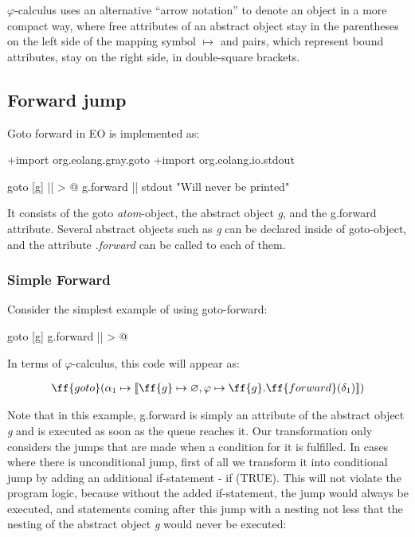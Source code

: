 \documentclass[sigplan,review,11pt,nonacm,natbib=false]{acmart}
\begin{document}
$\varphi$-calculus uses an alternative “arrow notation” to denote an object in a more compact way, where free attributes of an abstract object stay in the parentheses on the left side of the mapping symbol $\mapsto$ and pairs, which represent bound attributes, stay on the right side, in double-square brackets.


\subsection{Forward jump}
Goto forward in EO is implemented as:

\begin{ffcode}
+import org.eolang.gray.goto
+import org.eolang.io.stdout

goto
  [g]
    || > @
      g.forward ||
      stdout "Will never be printed"
\end{ffcode}

It consists of the goto \emph{atom}-object, the abstract object \emph{g}, and the g.forward attribute. Several abstract objects such as \emph{g} can be declared inside of goto-object, and the attribute \emph{.forward} can be called to each of them.

\subsubsection{Simple Forward}
Consider the simplest example of using goto-forward:

\begin{ffcode}
goto
  [g]
    g.forward || > @
\end{ffcode}

In terms of $\varphi$-calculus, this code will appear as:

\begin{equation}
\begin{split}
& \ff{goto} ( \alpha_1 \mapsto \llbracket \ff{g} \mapsto \varnothing, \varphi \mapsto \ff{g}.\ff{forward} (\delta_1) \rrbracket ) \\
\end{split}
\end{equation}

Note that in this example, g.forward is simply an attribute of the abstract object \emph{g} and is executed as soon as the queue reaches it.
Our transformation only considers the jumps that are made when a condition for it is fulfilled. In cases where there is unconditional jump, first of all we transform it into conditional jump by adding an additional if-statement - if (TRUE).
This will not violate the program logic, because without the added if-statement, the jump would always be executed, and statements coming after this jump with a nesting not less that the nesting of the abstract object \emph{g} would never be executed:
\end{document}

